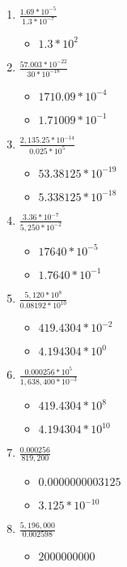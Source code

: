 \begin{enumerate}
\item {\Large $\frac{1.69*10^{-5}}{1.3*10^{-7}}$}
  \begin{itemize}
  \item $1.3 * 10^{2}$
  \end{itemize}
\item {\Large $\frac{57.003*10^{-22}}{30*10^{-18}}$}
  \begin{itemize}
  \item $1710.09 * 10^{-4}$
  \item $1.71009 * 10^{-1}$
  \end{itemize}
\item {\Large $\frac{2,135.25*10^{-14}}{0.025*10^{5}}$}
  \begin{itemize}
  \item $53.38125 *10^{-19}$
  \item $5.338125 *10^{-18}$
  \end{itemize}
\item {\Large $\frac{3.36*10^{-7}}{5,250*10^{-2}}$}
  \begin{itemize}
  \item $17640 * 10^{-5}$
  \item $1.7640 * 10^{-1}$
  \end{itemize}
\item {\Large $\frac{5,120*10^{8}}{0.08192*10^{10}}$}
  \begin{itemize}
  \item $419.4304 * 10^{-2}$
  \item $4.194304 * 10^{0}$
  \end{itemize}
\item {\Large $\frac{0.000256*10^{5}}{1,638,400*10^{-3}}$}
  \begin{itemize}
  \item $419.4304 * 10^{8}$
  \item $4.194304 * 10^{10}$
  \end{itemize}
\item {\Large $\frac{0.000256}{819,200}$}
  \begin{itemize}
  \item $0.0000000003125$
  \item $3.125 * 10^{-10}$
  \end{itemize}
\item {\Large $\frac{5,196,000}{0.002598}$}
  \begin{itemize}
  \item $2000000000$

\end{itemize}
\end{enumerate}
